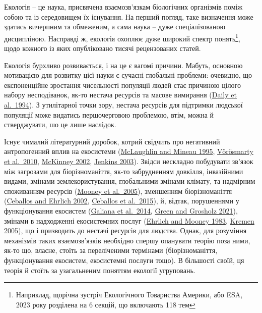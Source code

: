 \documentclass[
  11pt,
]{book}
\begin{document}
Екологія -- це наука, присвячена взаємозв'язкам біологічних організмів поміж собою та із середовищем їх існування. На перший погляд, таке визначення може здатись вичерпним та обмеженим, а сама наука -- дуже спеціалізованою дисципліною. Насправді ж, екологія охоплює дуже широкий спектр понять\footnote{Наприклад, щорічна зустріч Екологічного Товариства Америки, або ESA, 2023 року розділена на 6 секцій, що включають 118 тем}, щодо кожного із яких опубліковано тисячі рецензованих статей.

Екологія бурхливо розвивається, і на це є вагомі причини. Мабуть, основною мотивацією для розвитку цієї науки є сучасні глобальні проблеми: очевидно, що експоненційне зростання чисельності популяції людей стає причиною цілого набору несподіванок, як-то нестача ресурсів та масове вимирання (\href{https://www.jstor.org/stable/27503368}{Daily et al.~1994}). З утилітарної точки зору, нестача ресурсів для підтримки людської популяції може видатись першочерговою проблемою, втім, можна й стверджувати, шо це лише наслідок.

Існує чималий літературний доробок, котрий свідчить про негативний антропогенний вплив на екосистеми (\href{htpps://doi.org/10.1016/0167-8809(95)00609-V}{McLaughlin and Mineau 1995}, \href{https://doi.org/10.1038/nature09440}{Vörösmarty et al.~2010}, \href{https://academic.oup.com/bioscience/article/52/10/883-890/354714}{McKinney 2002}, \href{https://doi.org/10.1126/science.1088666}{Jenkins 2003}). Звідси нескладно побудувати зв'язок між загрозами для біорізноманіття, як-то забрудненням довкілля, інвазійними видами, змінами землекористування, глобальними змінами клімату, та надмірним споживанням ресурсів (\href{https://www.millenniumassessment.org/}{Mooney et al.~2005}), зменшенням біорізноманіття (\href{https://doi.org/10.1126/science.1069349}{Ceballos and Ehrlich 2002}, \href{https://doi.org/10.1126/sciadv.1400253}{Ceballos et al.~2015}), й, відтак, порушеннями у функціонування екосистем (\href{https://doi.org/10.1111/j.1600-0706.2013.00859.x}{Galiana et al.~2014}, \href{https://doi.org/https://doi.org/10.1002/fee.2277}{Green and Grosholz 2021}), змінами в надходженні екосистемних послуг (\href{https://doi.org/10.2307/1309037}{Ehrlich and Mooney 1983}, \href{https://doi.org/10.1111/j.1461-0248.2005.00751.x}{Kremen 2005}), що і призводить до нестачі ресурсів для людства. Однак, для розуміння механізмів таких взаємозв'язків необхідно спершу опанувати теорію поза ними, як-то що, власне, стоїть за переліченими термінами (біорізноманіття, функціонування екосистем, екосистемні послуги тощо). В більшості своїй, ця теорія й стоїть за узагальненим поняттям екології угруповань.
\end{document}

